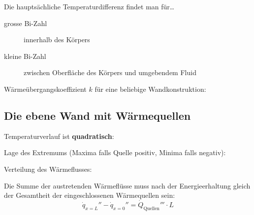 			Die hauptsächliche Temperaturdifferenz findet man für…
			\begin{description}
				\item[grosse Bi-Zahl] innerhalb des Körpers
				\item[kleine Bi-Zahl] zwischen Oberfläche des Körpers und umgebendem Fluid
			\end{description}


		Wärmeübergangskoeffizient $k$ für eine beliebige Wandkonstruktion:

	\subsection{Die ebene Wand mit Wärmequellen} %
		Temperaturverlauf ist \textbf{quadratisch}:

		Lage des Extremums (Maxima falls Quelle positiv, Minima falls negativ):

		Verteilung des Wärmeflusses:

		Die Summe der austretenden Wärmeflüsse muss nach der Energieerhaltung gleich der Gesamtheit der eingeschlossenen Wärmequellen sein:
		\[
			\dot q_{x=L}'' -
			\dot q_{x=0}'' = \dot Q_\text{Quellen}''' \cdot L
		\]


